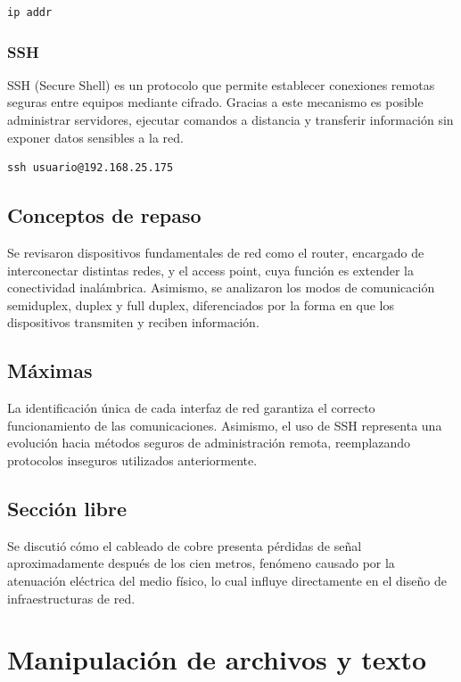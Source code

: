\documentclass[11pt, letterpaper]{article}
\begin{document}
\begin{verbatim}
ip addr
\end{verbatim}
\subsubsection{SSH}
\label{sec:org33d6782}

SSH (Secure Shell) es un protocolo que permite establecer conexiones
remotas seguras entre equipos mediante cifrado. Gracias a este
mecanismo es posible administrar servidores, ejecutar comandos a
distancia y transferir información sin exponer datos sensibles a la
red.

\begin{verbatim}
ssh usuario@192.168.25.175
\end{verbatim}
\subsection{Conceptos de repaso}
\label{sec:org1f79a0a}

Se revisaron dispositivos fundamentales de red como el router, encargado
de interconectar distintas redes, y el access point, cuya función es
extender la conectividad inalámbrica. Asimismo, se analizaron los
modos de comunicación semiduplex, duplex y full duplex, diferenciados
por la forma en que los dispositivos transmiten y reciben información.
\subsection{Máximas}
\label{sec:orgd6f7e0a}

La identificación única de cada interfaz de red garantiza el correcto
funcionamiento de las comunicaciones. Asimismo, el uso de SSH representa
una evolución hacia métodos seguros de administración remota,
reemplazando protocolos inseguros utilizados anteriormente.
\subsection{Sección libre}
\label{sec:org6d093ca}

Se discutió cómo el cableado de cobre presenta pérdidas de señal
aproximadamente después de los cien metros, fenómeno causado por la
atenuación eléctrica del medio físico, lo cual influye directamente en
el diseño de infraestructuras de red.
\section{Manipulación de archivos y texto}
\label{sec:org0d94ec0}
\end{document}
